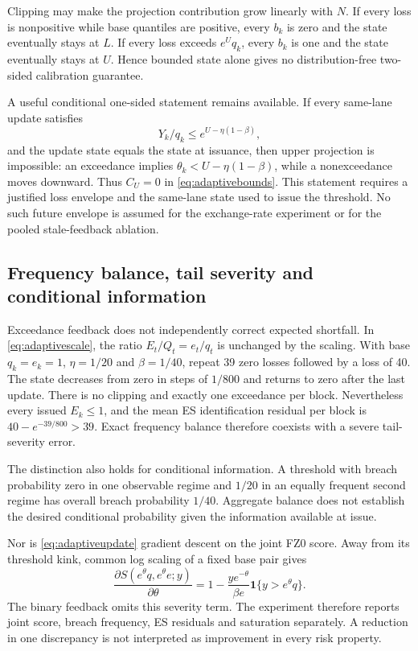 \documentclass[11pt,a4paper]{article}
\theoremstyle{definition}\newtheorem{definition}[theorem]{Definition}
\begin{document}
Clipping may make the projection contribution grow linearly with $N$. If every loss is nonpositive while base quantiles are positive, every $b_k$ is zero and the state eventually stays at $L$. If every loss exceeds $e^Uq_k$, every $b_k$ is one and the state eventually stays at $U$. Hence bounded state alone gives no distribution-free two-sided calibration guarantee.

A useful conditional one-sided statement remains available. If every same-lane update satisfies
\begin{equation}
 Y_k/q_k\le e^{U-\eta(1-\beta)},\label{eq:adaptiveenvelope}
\end{equation}
and the update state equals the state at issuance, then upper projection is impossible: an exceedance implies $\theta_k<U-\eta(1-\beta)$, while a nonexceedance moves downward. Thus $C_U=0$ in \eqref{eq:adaptivebounds}. This statement requires a justified loss envelope and the same-lane state used to issue the threshold. No such future envelope is assumed for the exchange-rate experiment or for the pooled stale-feedback ablation.

\subsection{Frequency balance, tail severity and conditional information}
Exceedance feedback does not independently correct expected shortfall. In \eqref{eq:adaptivescale}, the ratio $E_t/Q_t=e_t/q_t$ is unchanged by the scaling. With base $q_k=e_k=1$, $\eta=1/20$ and $\beta=1/40$, repeat 39 zero losses followed by a loss of 40. The state decreases from zero in steps of $1/800$ and returns to zero after the last update. There is no clipping and exactly one exceedance per block. Nevertheless every issued $E_k\le1$, and the mean ES identification residual per block is $40-e^{-39/800}>39$. Exact frequency balance therefore coexists with a severe tail-severity error.

The distinction also holds for conditional information. A threshold with breach probability zero in one observable regime and $1/20$ in an equally frequent second regime has overall breach probability $1/40$. Aggregate balance does not establish the desired conditional probability given the information available at issue.

Nor is \eqref{eq:adaptiveupdate} gradient descent on the joint FZ0 score. Away from its threshold kink, common log scaling of a fixed base pair gives
\begin{equation}
 \frac{\partial S(e^\theta q,e^\theta e;y)}{\partial\theta}
 =1-\frac{y e^{-\theta}}{\beta e}\mathbf1\{y>e^\theta q\}.
 \label{eq:adaptivefzgradient}
\end{equation}
The binary feedback omits this severity term. The experiment therefore reports joint score, breach frequency, ES residuals and saturation separately. A reduction in one discrepancy is not interpreted as improvement in every risk property.
\end{document}
